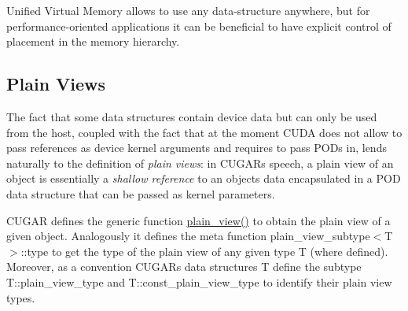 \begin{DoxyParagraph}{}
Unified Virtual Memory allows to use any data-\/structure anywhere, but for performance-\/oriented applications it can be beneficial to have explicit control of placement in the memory hierarchy.
\end{DoxyParagraph}
\hypertarget{host_device_page_PlainViewsSection}{}\subsection{Plain Views}\label{host_device_page_PlainViewsSection}
\begin{DoxyParagraph}{}
The fact that some data structures contain device data but can only be used from the host, coupled with the fact that at the moment C\+U\+DA does not allow to pass references as device kernel arguments and requires to pass P\+O\+Ds in, lends naturally to the definition of {\itshape plain views}\+: in C\+U\+G\+AR\textquotesingle{}s speech, a plain view of an object is essentially a {\itshape shallow reference} to an object\textquotesingle{}s data encapsulated in a P\+OD data structure that can be passed as kernel parameters. 
\end{DoxyParagraph}
\begin{DoxyParagraph}{}
C\+U\+G\+AR defines the generic function \hyperlink{group___basic_ga6eb01f34e803fa6b384bf9930f6db426}{plain\+\_\+view()} to obtain the plain view of a given object. Analogously it defines the meta function plain\+\_\+view\+\_\+subtype$<$\+T$>$\+::type to get the type of the plain view of any given type T (where defined). Moreover, as a convention C\+U\+G\+AR\textquotesingle{}s data structures T define the subtype T\+::plain\+\_\+view\+\_\+type and T\+::const\+\_\+plain\+\_\+view\+\_\+type to identify their plain view types. 
\end{DoxyParagraph}
